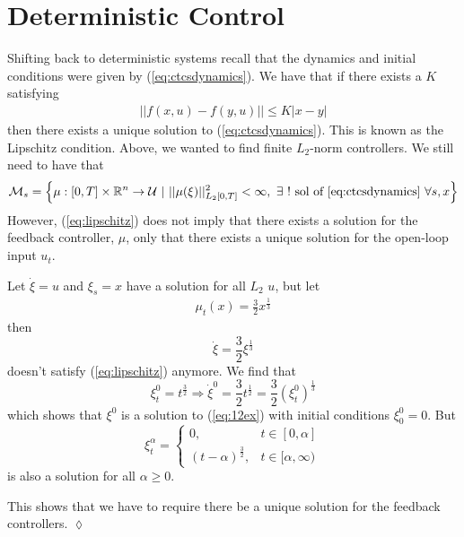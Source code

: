 \section{Deterministic Control}
Shifting back to deterministic systems recall that the dynamics and initial conditions were given by (\ref{eq:ctcsdynamics}).
We have that if there exists a $K$ satisfying
\begin{align}
\label{eq:lipschitz}
||f(x,u)-f(y,u)||\leq K|x-y|
\end{align}
then there exists a unique solution to (\ref{eq:ctcsdynamics}).
This is known as the Lipschitz condition.
Above, we wanted to find finite $L_2$-norm controllers.
We still need to have that
\begin{align}
\label{eq:controlspace}
\mathcal{M}_s = \left\lbrace \mu:[0,T]\times\mathbb{R}^n\to\mathcal{U}~|~||\mu(\xi)||^2_{L_2[0,T]}<\infty,~\exists~! \text{~sol~of~\ref{eq:ctcsdynamics} } \forall s,x \right\rbrace
\end{align}
However, (\ref{eq:lipschitz}) does not imply that there exists a solution for the feedback controller, $\mu$, only that there exists a unique solution for the open-loop input $u_t$.

\begin{example}
Let $\dot{\xi}=u$ and $\xi_s=x$ have a solution for all $L_2$ $u$, but let
\begin{align}
\label{eq:12ex}
\mu_t(x)=\frac{3}{2}x^{\frac{1}{3}}
\end{align}
then
$$\dot{\xi}=\frac{3}{2}\xi^{\frac{1}{3}}$$
doesn't satisfy (\ref{eq:lipschitz}) anymore.
  We find that
$$\xi_t^0=t^{\frac{3}{2}} \Rightarrow \dot{\xi}^0=\frac{3}{2}t^{\frac{1}{2}} = \frac{3}{2}{(\xi_t^0)}^{\frac{1}{3}}$$
which shows that $\xi^0$ is a solution to (\ref{eq:12ex}) with initial conditions $\xi_0^0=0$.
But
$$\xi_t^\alpha = \begin{cases} 0, & t\in[0,\alpha] \\ {(t-\alpha)}^{\frac{3}{2}}, & t\in[\alpha,\infty) \end{cases}$$%
is also a solution for all $\alpha\geq0$.

This shows that we have to require there be a unique solution for the feedback controllers.
$\lozenge$
\end{example}%
